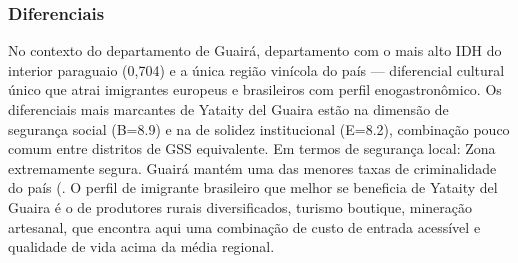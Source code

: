 \subsubsection*{Diferenciais}\label{dif-yataity-del-guaira-0418}
No contexto do departamento de Guairá, departamento com o mais alto IDH do interior paraguaio (0,704) e a única região vinícola do país — diferencial cultural único que atrai imigrantes europeus e brasileiros com perfil enogastronômico. Os diferenciais mais marcantes de Yataity del Guaira estão na dimensão de segurança social (B=8.9) e na de solidez institucional (E=8.2), combinação pouco comum entre distritos de GSS equivalente. Em termos de segurança local: Zona extremamente segura. Guairá mantém uma das menores taxas de criminalidade do país (. O perfil de imigrante brasileiro que melhor se beneficia de Yataity del Guaira é o de produtores rurais diversificados, turismo boutique, mineração artesanal, que encontra aqui uma combinação de custo de entrada acessível e qualidade de vida acima da média regional.
